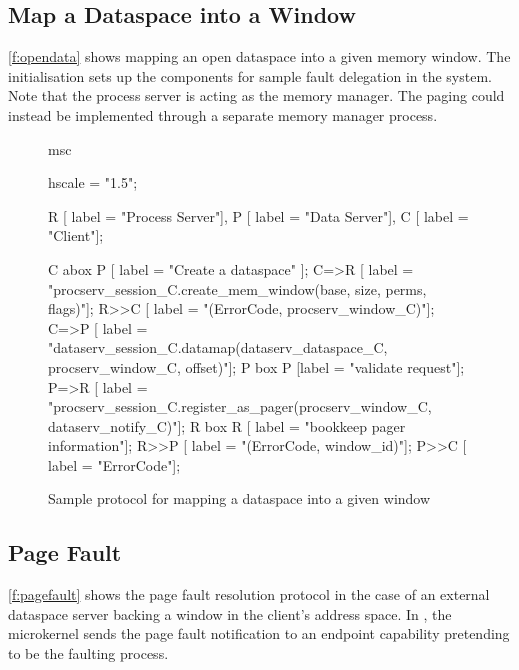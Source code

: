 \subsection{Map a Dataspace into a Window}

\autoref{f:opendata} shows mapping an open dataspace into a given memory window. The initialisation sets up the components for sample fault delegation in the system.  Note that the process server is acting as the memory manager. The paging could instead be implemented through a separate memory manager process.

\begin{figure}[htb]
  \begin{center}
    \begin{msc}
      msc {
        hscale = "1.5";

        R [ label = "Process Server"],
        P [ label = "Data Server"],
        C [ label = "Client"];

        C abox P [ label = "Create a dataspace" ];
        C=>R [ label = "procserv\_session\_C.create\_mem\_window(base, size, perms, flags)"];
        R>>C [ label = "(ErrorCode, procserv\_window\_C)"];
        C=>P [ label = "dataserv\_session\_C.datamap(dataserv\_dataspace\_C, procserv\_window\_C, offset)"];
        P box P [label = "validate request"];
        P=>R [ label = "procserv\_session\_C.register\_as\_pager(procserv\_window\_C, dataserv\_notify\_C)"];
        R box R [ label = "bookkeep pager information"];
        R>>P [ label = "(ErrorCode, window\_id)"];
        P>>C [ label = "ErrorCode"];
      }
    \end{msc}
  \end{center}
  \caption{Sample protocol for mapping a dataspace into a given window}
  \label{f:opendata}
\end{figure}

\subsection{Page Fault}

\autoref{f:pagefault} shows the page fault resolution protocol in the case of an external dataspace server backing a window in the client's address space. In , the \seLf microkernel sends the page fault notification to an endpoint capability pretending to be the faulting process.

